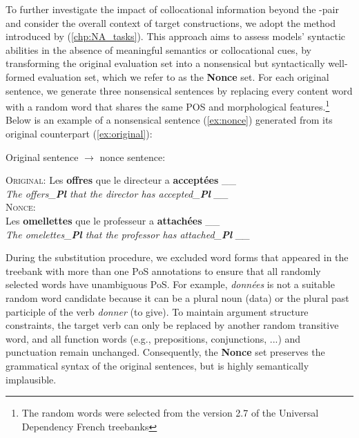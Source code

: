 To further investigate the impact of collocational information beyond the \cue-\target pair and consider the overall context of target constructions, we adopt the method introduced by \cite{gulordava-etal-2018-colorless} (\textsection\ref{chp:NA_tasks}). This approach aims to assess models' syntactic abilities in the absence of meaningful semantics or collocational cues, by transforming the original evaluation set into a nonsensical but syntactically well-formed evaluation set, which we refer to as the \textbf{Nonce} set. For each original sentence, we generate three nonsensical sentences by replacing every content word with a random word that shares the same POS and morphological features.\footnote{The random words were selected from the version 2.7 of the Universal Dependency French treebanks} Below is an example of a nonsensical sentence (\ref{ex:nonce}) generated from its original counterpart (\ref{ex:original}):  
\begin{exe}
    \ex  Original sentence $\rightarrow$ nonce sentence:
    \begin{xlist}
    \ex \label{ex:original} \textsc{Original: } Les \textbf{offres} que le directeur a \textbf{acceptées}  \_\_    \\
     \textit {The offers\_\textbf{Pl} that the director has accepted\_\textbf{Pl} \_\_}     \\
     \vspace{-4ex}
    \ex \label{ex:nonce} \textsc{Nonce: } \\
    Les \textbf{omellettes} que le professeur a \textbf{attachées} \_\_  \\
     \textit {The omelettes\_\textbf{Pl} that the professor has attached\_\textbf{Pl} \_\_}     \\
     \end{xlist}
     \vspace{-4ex}
\end{exe}
During the substitution procedure, we excluded word forms that appeared in the treebank with more than one PoS annotations to ensure that all randomly selected words have unambiguous PoS. For example, \textit{données} is not a suitable random word candidate because it can be a plural noun (data) or the plural past participle of the verb \textit{donner} (to give). To maintain argument structure constraints, the target verb can only be replaced by another random transitive word, and all function words (e.g., prepositions, conjunctions, ...) and punctuation remain unchanged. Consequently, the \textbf{Nonce} set preserves the grammatical syntax of the original sentences, but is highly semantically implausible.  


